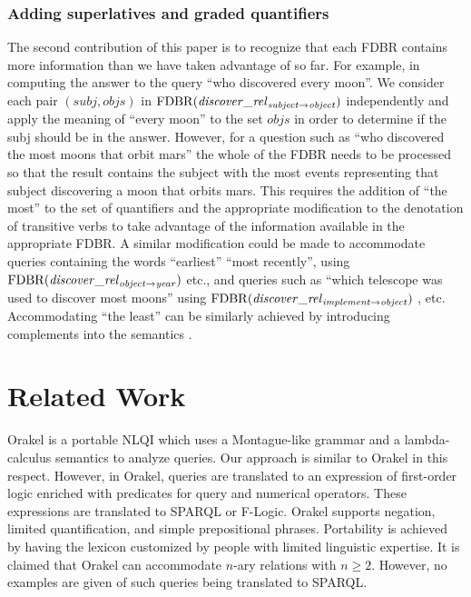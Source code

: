 \documentclass[../main.tex]{subfiles}
\begin{document}
\begin{refsection}
\subsubsection{Adding superlatives and graded quantifiers}
The second contribution of this paper is to recognize that each FDBR contains more information than we
have taken advantage of so far. For example, in computing the answer to the query ``who discovered
every moon''. We consider each pair $(\mathit{subj}, \mathit{objs})$ in $\mathrm{FDBR}({\mathit{\mathit{discover}\_rel}_{\mathit{subject}\rightarrow\mathit{object}}})$
independently and apply the meaning of ``every moon'' to the set $\mathit{objs}$ in order to determine if the
subj should be in the answer. However, for a question such as ``who discovered the most moons that
orbit mars'' the whole of the FDBR needs to be processed so that the result contains the subject with
the most events representing that subject discovering a moon that orbits mars. This requires the
addition of ``the most'' to the set of quantifiers and the appropriate modification to the denotation of
transitive verbs to take advantage of the information available in the appropriate FDBR. A similar
modification could be made to accommodate queries containing the words ``earliest'' ``most recently'', using $\mathrm{FDBR}({\mathit{\mathit{discover}\_rel}_{\mathit{object}\rightarrow\mathit{year}}})$ etc., and queries such as ``which telescope was used to discover most
moons'' using $\mathrm{FDBR}({\mathit{\mathit{discover}\_rel}_{\mathit{implement}\rightarrow\mathit{object}}})$ , etc.  Accommodating ``the least'' can be similarly achieved by introducing complements into the semantics \cite{peelarfrostwebist2020}.

\section{Related Work}
\label{ext:relatedwork}
Orakel \cite{cimiano:haase} is a portable NLQI which uses a Montague-like grammar and a lambda-calculus semantics to analyze queries. Our approach is similar to Orakel in this respect. However, in Orakel, queries are translated to an expression of first-order logic enriched with predicates for query and numerical operators. These expressions are translated to SPARQL or F-Logic. Orakel supports negation, limited quantification, and simple prepositional phrases. Portability is achieved by having the lexicon customized by people with limited linguistic expertise. It is claimed that Orakel can accommodate $n$-ary relations with $n \geq 2$. However, no examples are given of such queries being translated to SPARQL.


\end{refsection}
\end{document}
